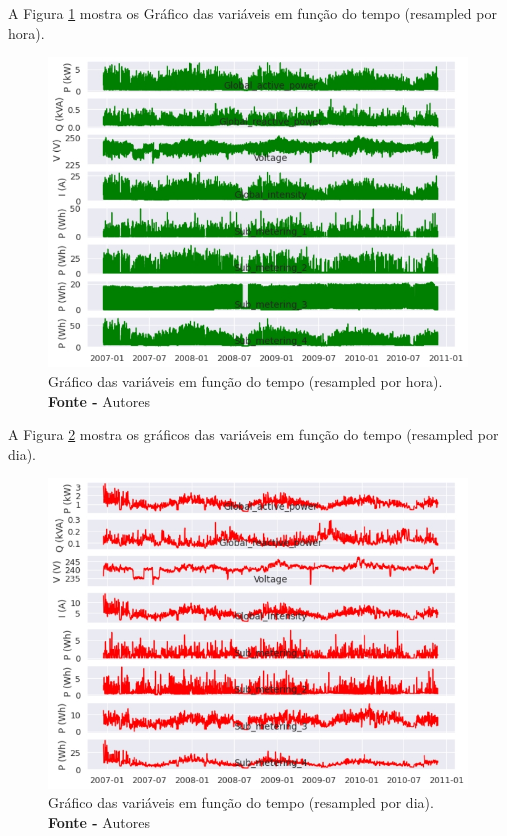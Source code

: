 A Figura \ref{fig: Gráfico das variáveis em função do tempo (resampled por hora)} mostra os Gráfico das variáveis em função do tempo (resampled por hora).
\begin{figure}[H]
    \centering
    \includegraphics[width=0.99\textwidth]{Figuras/4. Resultados e Discussões/Exer4/Gráfico das variáveis em função do tempo (resampled por hora).jpg}
    \caption{Gráfico das variáveis em função do tempo (resampled por hora).\\ \textbf{Fonte -} Autores}
    \label{fig: Gráfico das variáveis em função do tempo (resampled por hora)}
\end{figure}

A Figura \ref{fig: Gráfico das variáveis em função do tempo (resampled por dia)} mostra os gráficos das variáveis em função do tempo (resampled por dia).
\begin{figure}[H]
    \centering
    \includegraphics[width=0.99\textwidth]{Figuras/4. Resultados e Discussões/Exer4/Gráfico das variáveis em função do tempo (resampled por dia).jpg}
    \caption{Gráfico das variáveis em função do tempo (resampled por dia).\\ \textbf{Fonte -} Autores}
    \label{fig: Gráfico das variáveis em função do tempo (resampled por dia)}
\end{figure}

